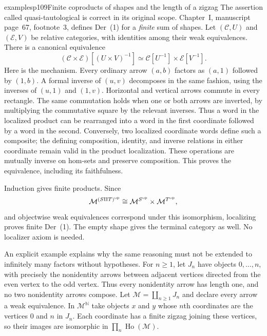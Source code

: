 \begin{dcomment}{examples}{p109}{Finite coproducts of shapes and the length of a zigzag}
The assertion called quasi-tautological is correct in its original scope. Chapter~I, manuscript page~67, footnote~3, defines Der~(1) for a \emph{finite} sum of shapes. Let $(\mathcal C,U)$ and $(\mathcal E,V)$ be relative categories, with identities among their weak equivalences. There is a canonical equivalence
\[
 (\mathcal C\times\mathcal E)[(U\times V)^{-1}]
 \simeq \mathcal C[U^{-1}]\times\mathcal E[V^{-1}].
\]
Here is the mechanism. Every ordinary arrow $(a,b)$ factors as $(a,1)$ followed by $(1,b)$. A formal inverse of $(u,v)$ decomposes in the same fashion, using the inverses of $(u,1)$ and $(1,v)$. Horizontal and vertical arrows commute in every rectangle. The same commutation holds when one or both arrows are inverted, by multiplying the commutative square by the relevant inverses. Thus a word in the localized product can be rearranged into a word in the first coordinate followed by a word in the second. Conversely, two localized coordinate words define such a composite; the defining composition, identity, and inverse relations in either coordinate remain valid in the product localization. These operations are mutually inverse on hom-sets and preserve composition. This proves the equivalence, including its faithfulness.

Induction gives finite products. Since
\[
 \mathcal M^{(S\amalg T)^{\rm op}}
 \cong \mathcal M^{S^{\rm op}}\times\mathcal M^{T^{\rm op}},
\]
and objectwise weak equivalences correspond under this isomorphism, localizing proves finite Der~(1). The empty shape gives the terminal category as well. No localizer axiom is needed.

An explicit example explains why the same reasoning must not be extended to infinitely many factors without hypotheses. For $n\geq1$, let $J_n$ have objects $0,\ldots,n$, with precisely the nonidentity arrows between adjacent vertices directed from the even vertex to the odd vertex. Thus every nonidentity arrow has length one, and no two nonidentity arrows compose. Let $\mathcal M=\coprod_{n\geq1}J_n$ and declare every arrow a weak equivalence. In $\mathcal M^{\mathbb N}$ take objects $x$ and $y$ whose $n$th coordinates are the vertices $0$ and $n$ in $J_n$. Each coordinate has a finite zigzag joining these vertices, so their images are isomorphic in $\prod_n\operatorname{Ho}(\mathcal M)$.


\end{dcomment}

